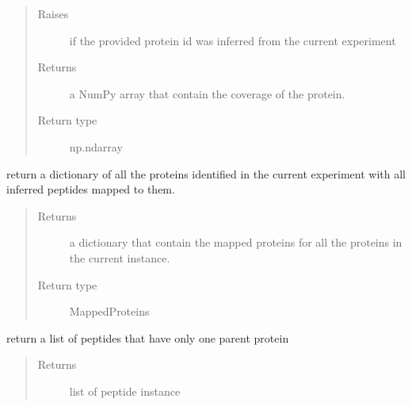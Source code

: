 \documentclass[letterpaper,10pt,english]{sphinxmanual}
\begin{document}
\begin{fulllineitems}
\begin{fulllineitems}
\begin{quote}
\begin{description}
\item[{Raises}] \leavevmode
{} \textendash{} if the provided protein id was inferred from the current experiment

\item[{Returns}] \leavevmode
a NumPy array that contain the coverage of the protein.

\item[{Return type}] \leavevmode
np.ndarray

\end{description}\end{quote}

\end{fulllineitems}


\begin{fulllineitems}
\label{\detokenize{IPTK.Classes:IPTK.Classes.Experiment.Experiment.get_mapped_proteins}}
return a dictionary of all the proteins identified in the current experiment with all inferred
peptides mapped to them.
\begin{quote}\begin{description}
\item[{Returns}] \leavevmode
a dictionary that contain the mapped proteins for all the proteins in the current instance.

\item[{Return type}] \leavevmode
MappedProteins

\end{description}\end{quote}

\end{fulllineitems}


\begin{fulllineitems}
\label{\detokenize{IPTK.Classes:IPTK.Classes.Experiment.Experiment.get_mono_parent_peptides}}
return a list of peptides that have only one parent protein
\begin{quote}\begin{description}
\item[{Returns}] \leavevmode
list of peptide instance


\end{description}
\end{quote}
\end{fulllineitems}
\end{fulllineitems}
\end{document}
